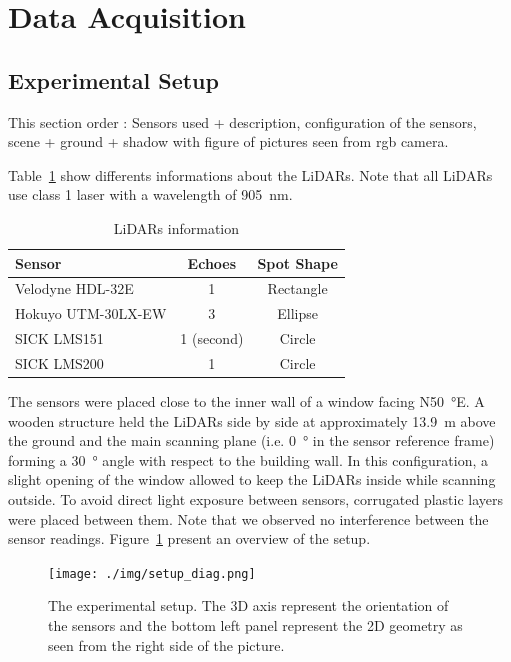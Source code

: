 \section{Data Acquisition}

\subsection{Experimental Setup}
This section order : Sensors used + description, configuration of the sensors, scene + ground + shadow with figure of pictures seen from rgb camera.



Table~\ref{tab:lidars} show differents informations about the LiDARs. Note that all LiDARs use class 1 laser with a wavelength of \SI{905}{\nano\meter}.
\begin{table}[htbp]
    \centering
    \begin{tabularx}{\linewidth}{|X||c|c|}\hline
        Sensor              & Echoes     & Spot Shape \\ \hline%
        Velodyne HDL-32E    & 1          & Rectangle  \\ \hline
        Hokuyo UTM-30LX-EW  & 3          & Ellipse    \\ \hline
        SICK LMS151         & 1 (second) & Circle     \\ \hline
        SICK LMS200         & 1          & Circle     \\ \hline
    \end{tabularx}
    \caption{LiDARs information}\label{tab:lidars}
\end{table}

The sensors were placed close to the inner wall of a window facing N\SI{50}{\degree}E. A wooden structure held the LiDARs side by side at approximately \SI{13.9}{\meter} above the ground and the main scanning plane (i.e. \SI{0}{\degree} in the sensor reference frame) forming a \SI{30}{\degree} angle with respect to the building wall. In this configuration, a slight opening of the window allowed to keep the LiDARs inside while scanning outside. To avoid direct light exposure between sensors, corrugated plastic layers were placed between them. Note that we observed no interference between the sensor readings. Figure~\ref{fig:setup} present an overview of the setup.

\begin{figure}[h]
    \centering
    \texttt{[image: ./img/setup\_diag.png]}
    \caption{The experimental setup. The 3D axis represent the orientation of the sensors and the bottom left panel represent the 2D geometry as seen from the right side of the picture.}
    \label{fig:setup}
\end{figure}

